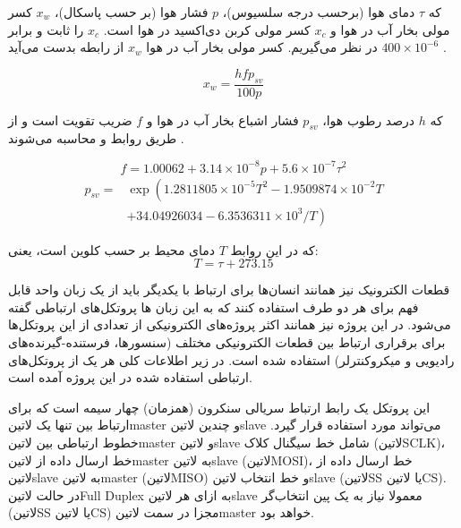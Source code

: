 که $\tau$ دمای هوا (برحسب درجه سلسیوس)، $p$ فشار هوا (بر حسب پاسکال)، $x_w$ کسر مولی بخار آب در هوا و $x_c$ کسر مولی کربن دی‌اکسید در هوا است. $x_c$ را ثابت و برابر $400 \times 10^{-6}$ در نظر می‌گیریم. کسر مولی بخار آب در هوا $x_w$ از رابطه  بدست می‌آید . 

\begin{equation}\label{eq:x_w}
	x_w=\frac{h f p_{sv}}{100 p}
\end{equation}

که $h$ درصد رطوب هوا، $p_{sv}$ فشار اشباع بخار آب در هوا و $f$ ضریب تقویت است و از طریق روابط 
 و  محاسبه می‌شوند .

\begin{equation}\label{eq:f}
	f=1.00062+3.14 \times 10^{-8} p+5.6 \times 10^{-7} \tau^{2}
\end{equation}
\begin{equation}\label{eq:p_sv}
	\begin{aligned}
		p_{s v}=& \exp \left(1.2811805 \times 10^{-5} T^{2}-1.9509874 \times 10^{-2} T\right.\\
		&\left.+34.04926034-6.3536311 \times 10^{3} / T\right)
	\end{aligned}
\end{equation}

که در این روابط $T$ دمای محیط بر حسب کلوین است، یعنی:
\begin{equation}
	T = \tau + 273.15
\end{equation}


قطعات الکترونیک نیز همانند انسان‌ها برای ارتباط با یکدیگر باید از یک زبان واحد قابل فهم برای هر دو طرف استفاده کنند که به این زبان ها پروتکل‌های ارتباطی گفته می‌شود. در این پروژه نیز همانند اکثر پروژه‌های الکترونیکی از تعدادی از این پروتکل‌ها برای برقراری ارتباط بین قطعات الکترونیکی مختلف (سنسور‌ها، فرستنده-گیرنده‌های رادیویی و میکروکنترلر) استفاده شده است. در زیر اطلاعات کلی هر یک از پروتکل‌های ارتباطی استفاده شده در این پروژه آمده است.


این پروتکل یک رابط ارتباط سریالی سنکرون (همزمان) چهار سیمه است که برای ارتباط بین تنها یک ‌لاتین{master} و چندین ‌لاتین{slave} می‌تواند مورد استفاده قرار گیرد. خطوط ارتباطی بین ‌لاتین{master} و ‌لاتین{slave} شامل خط سیگنال کلاک (‌لاتین{SCLK})، خط ارسال داده از ‌لاتین{master} به ‌لاتین{slave} (‌لاتین{MOSI})، خط ارسال داده از ‌لاتین{slave} به ‌لاتین{master} (‌لاتین{MISO}) و خط انتخاب ‌لاتین{slave} (‌لاتین{SS} یا ‌لاتین{CS}). در حالت ‌لاتین{Full Duplex} به ازای هر ‌لاتین{slave} معمولا نیاز به یک پین انتخاب‌گر (‌لاتین{SS} یا ‌لاتین{CS}) مجزا در سمت ‌لاتین{master} خواهد بود. 

